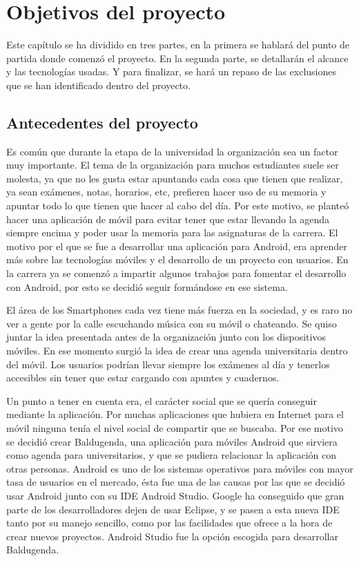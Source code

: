 \chapter{Objetivos del proyecto}
Este capítulo se ha dividido en tres partes, en la primera se hablará del punto de partida donde comenzó el proyecto. En la segunda parte, se detallarán el alcance y las tecnologías usadas. Y para finalizar, se hará un repaso de las exclusiones que se han identificado dentro del proyecto.
\section{Antecedentes del proyecto}
\label{secc:Antecedentes}
Es común que durante la etapa de la universidad la organización sea un factor muy importante. El tema de la organización para muchos estudiantes suele ser molesta, ya que no les gusta estar apuntando cada cosa que tienen que realizar, ya sean exámenes, notas, horarios, etc, prefieren hacer uso de su memoria y apuntar todo lo que tienen que hacer al cabo del día. Por este motivo, se planteó hacer una aplicación de móvil para evitar tener que estar llevando la agenda siempre encima y poder usar la memoria para las asignaturas de la carrera.
El motivo por el que se fue a desarrollar una aplicación para Android, era aprender más sobre las tecnologías móviles y el desarrollo de un proyecto con usuarios. En la carrera ya se comenzó a impartir algunos trabajos para fomentar el desarrollo con Android, por esto se decidió seguir formándose en ese sistema.

El área de los Smartphones cada vez tiene más fuerza en la sociedad, y es raro no ver a gente por la calle escuchando música con su móvil o chateando. Se quiso juntar la idea presentada antes de la organización junto con los dispositivos móviles. En ese momento surgió la idea de crear una agenda universitaria dentro del móvil. Los usuarios podrían llevar siempre los exámenes al día y tenerlos accesibles sin tener que estar cargando con apuntes y cuadernos.

Un punto a tener en cuenta era, el carácter social que se quería conseguir  mediante la aplicación. Por muchas aplicaciones que hubiera en Internet para el móvil ninguna tenía el nivel social de compartir que se buscaba. Por ese motivo se decidió crear Baldugenda, una aplicación para móviles Android que sirviera como agenda para universitarios, y que se pudiera relacionar la aplicación con otras personas. Android es uno de los sistemas operativos para móviles con mayor tasa de usuarios en el mercado, ésta fue una de las causas por las que se decidió usar Android junto con su  IDE Android Studio. Google ha conseguido que gran parte de los desarrolladores dejen de usar Eclipse, y se pasen a esta nueva IDE tanto por su manejo sencillo, como por las facilidades que ofrece a la hora de crear nuevos proyectos. Android Studio fue la opción escogida para desarrollar Baldugenda.  

